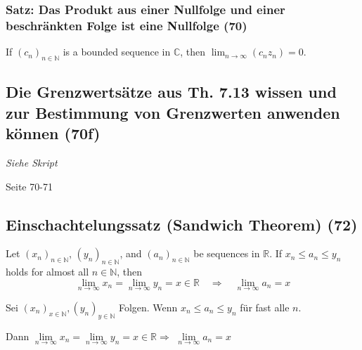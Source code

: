 \subsubsection{Satz: Das Produkt aus einer Nullfolge und einer beschränkten Folge ist eine Nullfolge (70)}
If $(c _ { n }) _ { n \in \mathbb { N } }$ is a bounded sequence in $\mathbb{C}$, then $\lim _ { n \rightarrow \infty } (c_n z_n) = 0$.

\subsection{Die Grenzwertsätze aus Th. 7.13 wissen und zur Bestimmung von Grenzwerten anwenden können (70f)}
\textit{Siehe Skript} \newline
\begin{leftbar}
Seite 70-71
\end{leftbar}

\subsection{Einschachtelungssatz (Sandwich Theorem) (72)}
Let $(x _ { n }) _ { n \in \mathbb { N } }$, $(y _ { n }) _ { n \in \mathbb { N } }$, and $(a _ { n }) _ { n \in \mathbb { N } }$ be sequences in $\mathbb{R}$. If $x _ { n } \leq a _ { n } \leq y _ { n }$ holds for almost all $n \in \mathbb { N }$, then
\begin{equation}
\lim _ { n \rightarrow \infty } x _ { n } = \lim _ { n \rightarrow \infty } y _ { n } = x \in \mathbb { R } \quad \Rightarrow \quad \lim _ { n \rightarrow \infty } a _ { n } = x
\end{equation} \newline
\begin{leftbar}
Sei $(x_n)_{x \in \mathbb{N}}, (y_n)_{y \in \mathbb{N}}$ Folgen. Wenn $x_n \leq a_n \leq y_n$ für fast alle $n$.

Dann $\lim\limits_{n \rightarrow \infty}{x_n} = \lim\limits_{n \rightarrow \infty}{y_n} = x \in \mathbb{R} \Rightarrow$
$\lim\limits_{n \rightarrow \infty}{a_n} = x$
\end{leftbar}

